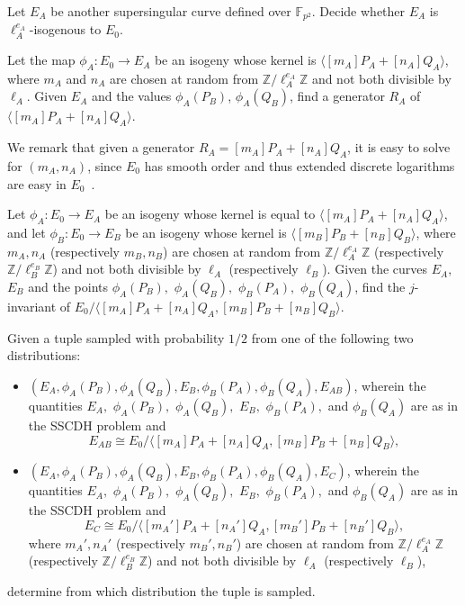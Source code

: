 \documentclass[jmc]{degruyter-journal-a}
\theoremstyle{definition}
\newcommand{\ZZ}{{\mathbb{Z}}}
\newcommand{\FF}{{\mathbb{F}}}
\newcommand{\iso}{\cong}
\newcommand{\cyc}[1]{{\langle #1 \rangle}}
\begin{document}
\begin{problem} Let
  $E_A$ be another supersingular curve defined over
  $\FF_{p^2}$. Decide whether $E_A$ is $\ell_A^{e_A}$-isogenous to
  $E_0$.
\end{problem}

\begin{problem}
Let the map $\phi_A \colon E_0 \to E_A$ be an isogeny whose kernel is
$\cyc{[m_A]P_A+[n_A]Q_A}$, where $m_A$ and $n_A$ are chosen at random
from $\ZZ/\ell_A^{e_A}\ZZ$ and not both divisible by $\ell_A$.  Given
$E_A$ and the values $\phi_A(P_B)$, $\phi_A(Q_B)$, find a generator
$R_A$ of $\cyc{[m_A]P_A+[n_A]Q_A}$.
\end{problem}

We remark that given a generator $R_A = [m_A]P_A+[n_A]Q_A$, it is easy
to solve for $(m_A,n_A)$, since $E_0$ has smooth order and thus
extended discrete logarithms are easy in $E_0$~\cite{teske-ph}.

\begin{problem} Let $\phi_A \colon E_0 \to E_A$ be an isogeny
  whose kernel is equal to $\cyc{[m_A]P_A+[n_A]Q_A}$, and let $\phi_B \colon
  E_0 \to E_B$ be an isogeny whose kernel is
  $\cyc{[m_B]P_B+[n_B]Q_B}$, where $m_A,n_A$ (respectively $m_B,n_B$)
  are chosen at random from $\ZZ/\ell_A^{e_A}\ZZ$ (respectively
  $\ZZ/\ell_B^{e_B}\ZZ$) and not both divisible by $\ell_A$ (respectively
  $\ell_B$). Given the curves $E_A,$ $E_B$ and the points
  $\phi_A(P_B),$ $\phi_A(Q_B),$ $\phi_B(P_A),$ $\phi_B(Q_A)$, find the
  $j$-invariant of $E_0/\cyc{[m_A]P_A+[n_A]Q_A ,[m_B]P_B+[n_B]Q_B}$.
\end{problem}

\begin{problem} Given a tuple sampled with probability $1/2$ from one of
  the following two distributions:
\begin{itemize} 
\item $(E_A, \phi_A(P_B), \phi_A(Q_B), E_B, \phi_B(P_A), \phi_B(Q_A),
  E_{AB})$, wherein the quantities $E_A,$ $\phi_A(P_B),$ $\phi_A(Q_B),$ $E_B,$
  $\phi_B(P_A),$ and $\phi_B(Q_A)$ are as in the SSCDH problem and \[E_{AB} \iso
  E_0/\cyc{[m_A]P_A+[n_A]Q_A ,[m_B]P_B+[n_B]Q_B},\]
\item $(E_A, \phi_A(P_B), \phi_A(Q_B), E_B, \phi_B(P_A), \phi_B(Q_A),
  E_C)$, wherein the quantities $E_A,$ $\phi_A(P_B),$ $\phi_A(Q_B),$ $E_B,$
  $\phi_B(P_A),$ and $\phi_B(Q_A)$ are as in the SSCDH problem and \[E_{C} \iso
  E_0/\cyc{[m_A']P_A+[n_A']Q_A ,[m_B']P_B+[n_B']Q_B},\] where
  $m_A',n_A'$ (respectively $m_B',n_B'$) are chosen at random from
  $\ZZ/\ell_A^{e_A}\ZZ$ (respectively $\ZZ/\ell_B^{e_B}\ZZ$) and not both
  divisible by $\ell_A$ (respectively $\ell_B$),
\end{itemize}
determine from which distribution the tuple is sampled.
\end{problem}
\end{document}
